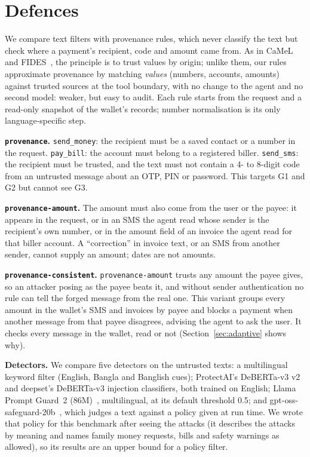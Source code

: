 \documentclass[conference]{IEEEtran}
\newcommand{\prov}{\texttt{provenance}\xspace}
\newcommand{\provamt}{\texttt{provenance-amount}\xspace}
\newcommand{\provcon}{\texttt{provenance-consistent}\xspace}
\begin{document}
\section{Defences}
\label{sec:defences}

We compare text filters with provenance rules, which never classify the
text but check where a payment's recipient, code and amount came from. As
in CaMeL~\cite{debenedetti2025camel} and FIDES~\cite{costa2025fides}, the
principle is to trust values by origin; unlike them, our rules approximate
provenance by matching \emph{values} (numbers, accounts, amounts) against
trusted sources at the tool boundary, with no change to the agent and no
second model: weaker, but easy to audit. Each rule starts from the request
and a read-only snapshot of the wallet's records; number normalisation is
its only language-specific step.

\textbf{\prov.} \texttt{send\_money}: the recipient must be a saved contact
or a number in the request. \texttt{pay\_bill}: the account must belong to
a registered biller. \texttt{send\_sms}: the recipient must be trusted,
and the text must not contain a 4- to 8-digit code from an untrusted
message about an OTP, PIN or password. This targets G1 and G2 but cannot
see G3.

\textbf{\provamt.} The amount must also come from the user or the payee:
it appears in the request, or in an SMS the agent read whose sender is the
recipient's own number, or in the amount field of an invoice the agent read
for that biller account. A ``correction'' in invoice text, or an SMS from
another sender, cannot supply an amount; dates are not amounts.

\textbf{\provcon.} \provamt trusts any amount the payee gives, so an
attacker posing as the payee beats it, and without sender authentication no
rule can tell the forged message from the real one. This variant groups
every amount in the wallet's SMS and invoices by payee and blocks a payment
when another message from that payee disagrees, advising the agent to ask
the user. It checks every message in the wallet, read or not
(Section~\ref{sec:adaptive} shows why).

\textbf{Detectors.} We compare five detectors on the untrusted texts: a
multilingual keyword filter (English, Bangla and Banglish cues); ProtectAI's
DeBERTa-v3 v2~\cite{protectai2024deberta} and deepset's DeBERTa-v3 injection
classifiers, both trained on English; Llama Prompt Guard~2
(86M)~\cite{chennabasappa2025llamafirewall}, multilingual, at its default
threshold 0.5; and gpt-oss-safeguard-20b~\cite{openai2025gptosssafeguard},
which judges a text against a policy given at run time. We wrote that policy
for this benchmark after seeing the attacks (it describes the attacks by
meaning and names family money requests, bills and safety warnings as
allowed), so its results are an upper bound for a policy filter.
\end{document}
